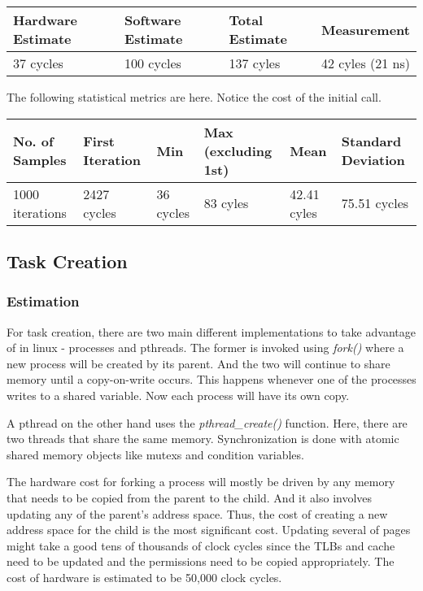 \documentclass[paper=a4, fontsize=11pt]{scrartcl}
\numberwithin{equation}{section}        %
\numberwithin{figure}{section}          %
\numberwithin{table}{section}               %
\begin{document}
\begin{center}
    \begin{tabular}{ | l | l | l | p{5cm} |}
    \hline
    Hardware Estimate & Software Estimate & Total Estimate & Measurement \\ \hline
    37 cycles & 100 cycles & 137 cyles & 42 cyles (21 ns) \\ 
    \hline
    \end{tabular}
\end{center}

The following statistical metrics are here.  Notice the cost of the initial call.

\begin{center}
    \begin{tabular}{ | l | l | l | l | l | l |}
    \hline
    No. of Samples & First Iteration & Min & Max (excluding 1st) & Mean & Standard Deviation \\ \hline
    1000 iterations & 2427 cycles & 36 cycles & 83 cyles & 42.41 cyles & 75.51 cycles \\ 
    \hline
    \end{tabular}
\end{center}


\subsection{Task Creation}

\subsubsection{Estimation}

For task creation, there are two main different implementations to take advantage of in linux - processes and pthreads.  The former is invoked using \textit{fork()} where a new process will be created by its parent.  And the two will continue to share memory until a copy-on-write occurs.  This happens whenever one of the processes writes to a shared variable.  Now each process will have its own copy.

A pthread on the other hand uses the \textit{pthread\_create()} function.  Here, there are two threads that share the same memory.  Synchronization is done with atomic shared memory objects like mutexs and condition variables.

The hardware cost for forking a process will mostly be driven by any memory that needs to be copied from the parent to the child.  And it also involves updating any of the parent's address space.  Thus, the cost of creating a new address space for the child is the most significant cost.  Updating several of pages might take a good tens of thousands of clock cycles since the TLBs and cache need to be updated and the permissions need to be copied appropriately.  The cost of hardware is estimated to be 50,000 clock cycles.
\end{document}
